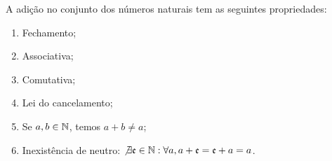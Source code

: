 \documentclass[../main.tex]{subfiles}
\begin{document}
\begin{prop}{A adição no conjunto dos números naturais tem as seguintes propriedades:}\label{nat-soma-props}
    \begin{enumerate}[label=(\roman*)]
        \item Fechamento;
    	\item Associativa;
    	\item Comutativa;
        \item Lei do cancelamento;
        \item Se $a,b \in \mathbb{N}$, temos $a + b \neq a$;\label{nat-soma-props-distinto}
    	\item Inexistência de neutro: $\not\exists \mathfrak{e} \in \mathbb{N} : \forall a, a + \mathfrak{e} = \mathfrak{e} + a = a$.
    \end{enumerate}
\end{prop}
\end{document}
